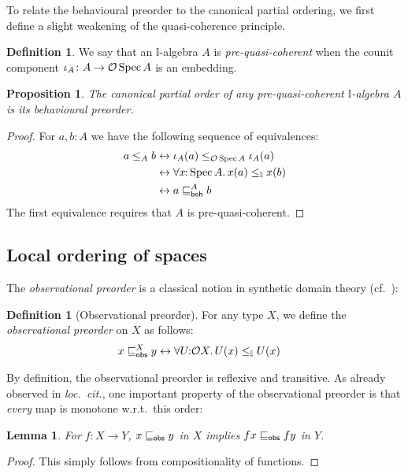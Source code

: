 \documentclass[a4paper,12pt]{amsart}
\newtheorem{lemma}[theorem]{Lemma}
\newtheorem{proposition}[theorem]{Proposition}
\theoremstyle{definition}
\newtheorem{definition}[theorem]{Definition}
\newcommand{\mbb}[1]{\mathbb{#1}}
\newcommand{\I}{\mbb I}
\newcommand{\fa}[2]{\forall #1\!\colon\!\!#2\mathpunct{.}}
\newcommand{\eq}{\leftrightarrow}
\newcommand{\spec}{\operatorname{Spec}}
\begin{document}
To relate the behavioural preorder to the canonical partial ordering, we first define a slight weakening of the quasi-coherence principle.

\begin{definition}
  We say that an $\I$-algebra $A$ is \emph{pre-quasi-coherent} when the counit component $\iota_A\colon A\to \opens\spec{A}$ is an embedding.
\end{definition}

\begin{proposition}\label{lem:canon-beh-coincide}
  The canonical partial order of any pre-quasi-coherent $\I$-algebra $A$ is its behavioural preorder.
\end{proposition}

\begin{proof}
  For $a,b:A$ we have the following sequence of equivalences:
  \begin{align*}
    a\le_A b 
    &\eq \iota_A(a) \le_{\opens\spec{A}} \iota_A(a)
    \\ 
    &\eq \fa{x}{\spec{A}} x(a) \le_{\I} x(b)
    \\ 
    &\eq a\behle[A]b
  \end{align*}
  The first equivalence requires that $A$ is pre-quasi-coherent.
\end{proof}


\subsection{Local ordering of spaces}

The \emph{observational preorder} is a classical notion in synthetic domain theory (cf.\ \citet{PhoaWesleyKym-Son1991DtiR,hyland1990first}):

\begin{definition}[Observational preorder]\label{defn:specialisation}
  For any type $X$, we define the \emph{observational preorder} on $X$ as follows:
  \begin{align*}
    x\obsle[X] y 
    &\eq \fa{U}{\opens{X}} U(x)\le_\I U(x)
  \end{align*}
\end{definition}

By definition, the observational preorder is reflexive and transitive. As already observed in \emph{loc.\ cit.}, one important property of the observational preorder is that \emph{every} map is monotone w.r.t.\ this order:

\begin{lemma}\label{lem:anymapmonotoneintriscorder}
  For $f \colon X \to Y$, $x \obsle y$ in $X$ implies $fx \obsle fy$ in $Y$.
\end{lemma}
\begin{proof}
  This simply follows from compositionality of functions.
\end{proof}
\end{document}
